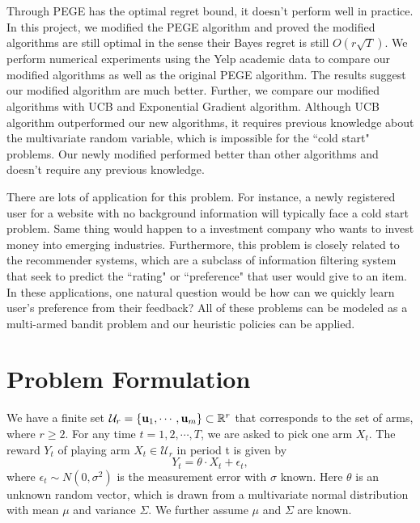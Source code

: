 \documentclass{article}
\theoremstyle{plain}
\theoremstyle{definition}
\begin{document}
Through PEGE has the optimal regret bound, it doesn't perform well in practice. In this project, we modified the PEGE algorithm and proved the modified algorithms are still optimal in the sense their Bayes regret is still $O(r\sqrt{T})$. We perform numerical experiments using the Yelp academic data to compare our modified algorithms as well as the original PEGE algorithm. The results suggest our modified algorithm are much better. Further, we compare our modified algorithms with UCB and Exponential Gradient algorithm. Although UCB algorithm outperformed our new algorithms, it requires previous knowledge about the multivariate random variable, which is impossible for the ``cold start" problems. Our newly modified performed better than other algorithms and doesn't require any previous knowledge.

There are lots of application for this problem. For instance, a newly registered user for a website with no background information will typically face a cold start problem. Same thing would happen to a investment company who wants to invest money into emerging industries. Furthermore, this problem is closely related to the recommender systems, which are a subclass of information filtering system that seek to predict the ``rating" or ``preference" that user would give to an item. In these applications, one natural question would be how can we quickly learn user's preference from their feedback? All of these problems can be modeled as a multi-armed bandit problem and our heuristic policies can be applied.





\section{Problem Formulation}
We have a finite set $\mathcal{U}_{r}=\{\bold{u}_{1},\cdots,\bold{u}_{m}\}\subset \mathbb{R}^{r}$ that corresponds to the set of arms, where $r\geq 2$. For any time $t=1,2,\cdots,T$, we are asked to pick one arm $X_{t}$. The reward $Y_{t}$ of playing arm $X_{t}\in \mathcal{U}_{r}$ in period t is given by
\begin{equation}
Y_{t} = \theta \cdot X_{t} + \epsilon_{t}, \nonumber
\end{equation}
where $\epsilon_{t}\sim N(0,\sigma^{2})$ is the measurement error with $\sigma$ known. Here $\theta$ is an unknown random vector, which is drawn from a multivariate normal distribution with mean $\mu$ and variance $\Sigma$. We further assume $\mu$ and $\Sigma$ are known.
\end{document}
